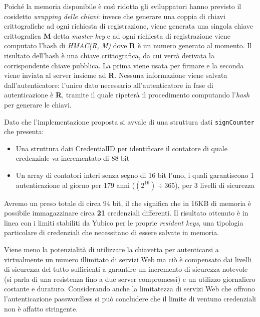 Poiché la memoria disponibile è così ridotta gli sviluppatori hanno previsto il cosidetto \emph{wrapping delle chiavi}: invece che generare una coppia di chiavi crittografiche ad ogni richiesta di registrazione, viene generata una singola chiave crittografica \textbf{M} detta \emph{master key} e ad ogni richiesta di registrazione viene computato l'hash di \emph{HMAC(R, M)} dove \textbf{R} è un numero generato al momento. Il risultato dell'hash è una chiave crittografica, da cui verrà derivata la corrispondente chiave pubblica. La prima viene usata per firmare e la seconda viene inviata al server insieme ad \textbf{R}. Nessuna informazione viene salvata dall'autenticatore: l'unico dato necessario all'autenticatore in fase di autenticazione è \textbf{R}, tramite il quale ripeterà il procedimento computando l'\emph{hash} per generare le chiavi. 

Dato che l'implementazione proposta si avvale di una struttura dati \verb*|signCounter| che presenta:
\begin{itemize}
	\item Una struttura dati CredentialID per identificare il contatore di quale credenziale va incrementato di $88$ bit
	\item Un array di contatori interi senza segno di 16 bit l'uno, i quali garantiscono 1 autenticazione al giorno per 179 anni ($(2^{16}) \div 365$), per 3 livelli di sicurezza
\end{itemize}

Avremo un preso totale di circa $94$ bit, il che significa che in 16KB di memoria è possibile immagazzinare circa \textbf{21} credenziali differenti. Il risultato ottenuto è in linea con i limiti stabiliti \cite{yubico:resident} da Yubico per le proprie \emph{resident keys}, una tipologia particolare di credenziali che necessitano di essere salvate in memoria.

Viene meno la potenzialità di utilizzare la chiavetta per autenticarsi a virtualmente un numero illimitato di servizi Web ma ciò è compensato dai livelli di sicurezza del tutto sufficienti a garantire un incremento di sicurezza notevole (si parla di una resistenza fino a due server compromessi) e un utilizzo giornaliero costante e duraturo. Considerando anche la limitatezza di servizi Web che offrono l'autenticazione passwordless si può concludere che il limite di ventuno credenziali non è affatto stringente. 

